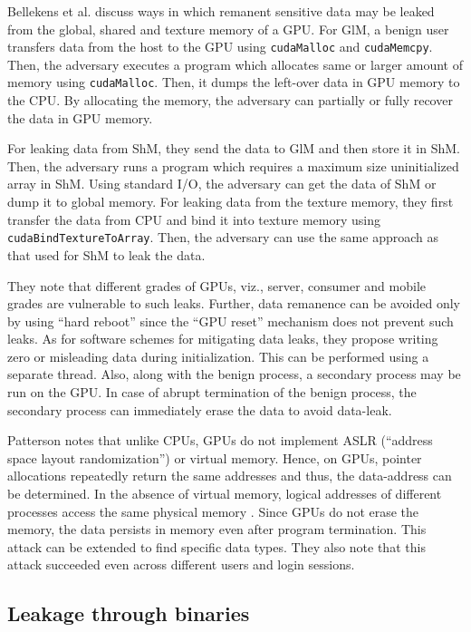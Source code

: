  
Bellekens et al. \cite{bellekens2015data} discuss ways in which remanent sensitive data may be leaked from the global, shared and texture memory of a GPU. For GlM, a benign user transfers data from the host to the GPU using {\tt cudaMalloc} and {\tt cudaMemcpy}. Then, the adversary executes a program which allocates same or larger amount of memory using {\tt cudaMalloc}. Then, it dumps the left-over data in GPU memory to the CPU. By allocating the memory, the adversary can partially or fully recover the data in GPU memory. 


For leaking data from ShM, they send the data to GlM and then store it in ShM. Then, the adversary runs a program which requires a maximum size uninitialized array in ShM. Using standard I/O, the adversary can get the data of ShM or dump it to global memory. For leaking data from the texture memory, they first transfer the data from CPU and bind it into texture memory using {\tt cudaBindTextureToArray}. Then, the adversary can use the same approach as that used for ShM to leak the data. 

They note that different grades of GPUs, viz., server, consumer and mobile grades are vulnerable to such leaks. Further, data remanence can be avoided only by using ``hard reboot'' since the ``GPU reset'' mechanism does not prevent such leaks. As for software schemes for mitigating data leaks, they propose writing zero or misleading data during initialization. This can be performed using a separate thread. Also, along with the benign process, a secondary process may be run on the GPU. In case of abrupt termination of the benign process, the secondary process can immediately erase the data to avoid data-leak. 
 


Patterson \cite{patterson2013vulnerability} notes that unlike CPUs, GPUs do not implement ASLR (``address space layout randomization'') or virtual memory. Hence, on GPUs, pointer allocations repeatedly return the same addresses and thus, the data-address can be determined. In the absence of virtual memory, logical addresses of different processes access the same physical memory \cite{mittal2017SurveyTLB}. Since GPUs do not erase the memory, the data persists in memory even after program termination. This attack can be extended to find specific data types. They also note that this attack succeeded even across different users and login sessions. 
    
\subsection{Leakage through binaries}\label{sec:leakagebinaries}

